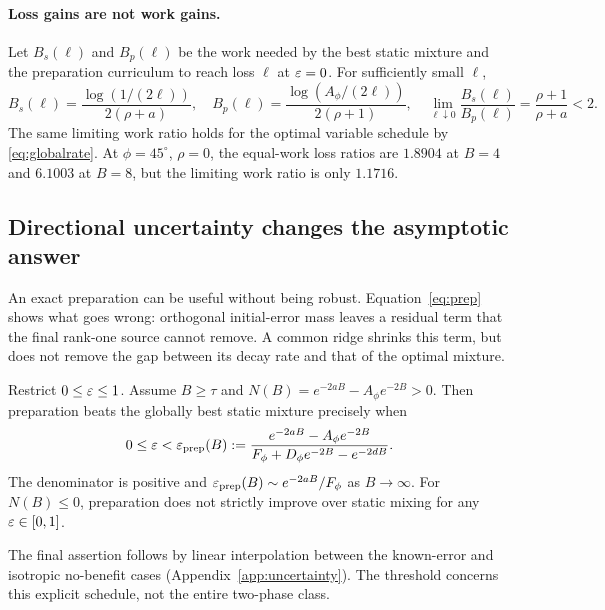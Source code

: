 \paragraph{Loss gains are not work gains.}
Let $B_s(\ell)$ and $B_p(\ell)$ be the work needed by the best static mixture and the preparation curriculum to reach loss $\ell$ at $\varepsilon=0$. For sufficiently small $\ell$,
\begin{equation}
 B_s(\ell)=\frac{\log(1/(2\ell))}{2(\rho+a)},\quad
 B_p(\ell)=\frac{\log(A_\phi/(2\ell))}{2(\rho+1)},\quad
 \lim_{\ell\downarrow0}\frac{B_s(\ell)}{B_p(\ell)}
 =\frac{\rho+1}{\rho+a}<2.\label{eq:work}
\end{equation}
The same limiting work ratio holds for the optimal variable schedule by \eqref{eq:globalrate}. At $\phi=45^\circ$, $\rho=0$, the equal-work loss ratios are $1.8904$ at $B=4$ and $6.1003$ at $B=8$, but the limiting work ratio is only $1.1716$.

\subsection{Directional uncertainty changes the asymptotic answer}\label{sec:uncertainty}
An exact preparation can be useful without being robust. Equation~\eqref{eq:prep} shows what goes wrong: orthogonal initial-error mass leaves a residual term that the final rank-one source cannot remove. A common ridge shrinks this term, but does not remove the gap between its decay rate and that of the optimal mixture.

\begin{theorem}\label{thm:threshold}
Restrict $0\le\varepsilon\le1$. Assume $B\ge\tau$ and $N(B)=e^{-2aB}-A_\phi e^{-2B}>0$. Then preparation beats the globally best static mixture precisely when
\begin{equation}
 0\le\varepsilon<\varepsilon_{\mathrm{prep}}(B):=
 \frac{e^{-2aB}-A_\phi e^{-2B}}
 {F_\phi+D_\phi e^{-2B}-e^{-2dB}}.\label{eq:threshold}
\end{equation}
The denominator is positive and $\varepsilon_{\mathrm{prep}}(B)\sim e^{-2aB}/F_\phi$ as $B\to\infty$. For $N(B)\le0$, preparation does not strictly improve over static mixing for any $\varepsilon\in[0,1]$.
\end{theorem}
The final assertion follows by linear interpolation between the known-error and isotropic no-benefit cases (Appendix~\ref{app:uncertainty}). The threshold concerns this explicit schedule, not the entire two-phase class.



